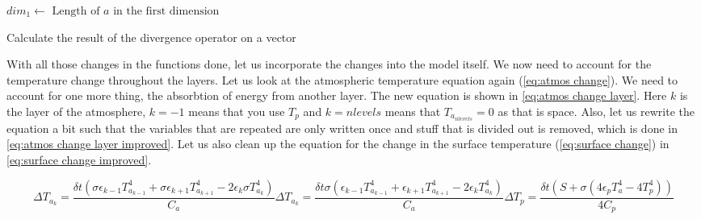 \begin{algorithm}[!hbt]
    $dim_1 \leftarrow \text{ Length of } a \text{ in the first dimension}$ \;
     \;
    \caption{Calculate the result of the divergence operator on a vector}
    \label{alg:divergence layer}
\end{algorithm}

With all those changes in the functions done, let us incorporate the changes into the model itself. We now need to account for the temperature change throughout the layers. Let us look at the 
atmospheric temperature equation again (\autoref{eq:atmos change}). We need to account for one more thing, the absorbtion of energy from another layer. The new equation is shown in 
\autoref{eq:atmos change layer}. Here $k$ is the layer of the atmosphere, $k = -1$ means that you use $T_p$ and $k = nlevels$ means that $T_{a_{nlevels}} = 0$ as that is space. Also, let us
rewrite the equation a bit such that the variables that are repeated are only written once and stuff that is divided out is removed, which is done in \autoref{eq:atmos change layer improved}.
Let us also clean up the equation for the change in the surface temperature (\autoref{eq:surface change}) in \autoref{eq:surface change improved}.

\begin{subequations}
    \begin{equation}
        \Delta T_{a_k} = \frac{\delta t (\sigma \epsilon_{k - 1}T_{a_{k - 1}}^4 + \sigma \epsilon_{k + 1}T_{a_{k + 1}}^4 - 2\epsilon_k\sigma T_{a_k}^4)}{C_a}
        \label{eq:atmos change layer}
    \end{equation}
    \begin{equation}
        \Delta T_{a_k} = \frac{\delta t \sigma (\epsilon_{k - 1}T_{a_{k - 1}}^4 + \epsilon_{k + 1}T_{a_{k + 1}}^4 - 2\epsilon_kT_{a_k}^4)}{C_a}
        \label{eq:atmos change layer improved}
    \end{equation}
    \begin{equation}
        \Delta T_p = \frac{\delta t (S + \sigma(4\epsilon_pT_a^4 - 4T_p^4))}{4C_p}
        \label{eq:surface change improved}
    \end{equation}
\end{subequations}

